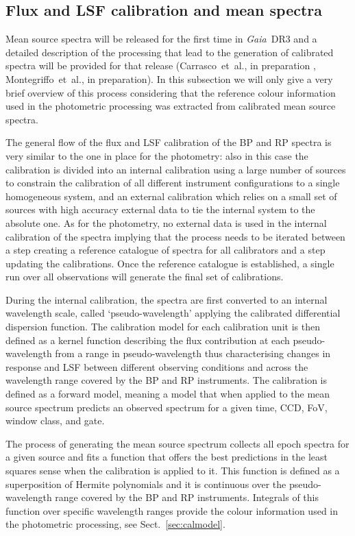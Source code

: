 \documentclass{aa}
\newcommand{\gaia}{\textit{Gaia}\xspace}
\newcommand{\drthree}{\gaia~DR3\xspace}
\newcommand{\xp}{BP and RP\xspace}
\newcommand{\citeipt}[1]{#1~et~al., in preparation\xspace}
\newcommand{\secname}{Sect.}
\newcommand{\secref}[1]{\secname~\ref{sec:#1}}
\begin{document}
\subsection{Flux and LSF calibration and mean spectra}\label{sec:meanspectra}

Mean source spectra will be released for the first time in \drthree and a detailed description of the processing that lead to the generation of calibrated spectra will be provided for that release (\citeipt{Carrasco} , \citeipt{Montegriffo}).
In this subsection we will only give a very brief overview of this process considering that the reference colour information used in the photometric processing was extracted from calibrated mean source spectra.

The general flow of the flux and LSF calibration of the \xp spectra is very similar to the one in place for the photometry: also in this case the calibration is divided into an internal calibration using a large number of sources to constrain the calibration of all different instrument configurations to a single homogeneous system, and an external calibration which relies on a small set of sources with high accuracy external data to tie the internal system to the absolute one. As for the photometry, no external data is used in the internal calibration of the spectra implying that the process needs to be iterated between a step creating a reference catalogue of spectra for all calibrators and a step updating the calibrations. 
Once the reference catalogue is established, a single run over all observations will generate the final set of calibrations.

During the internal calibration, the spectra are first converted to an internal wavelength scale, called `pseudo-wavelength' applying the calibrated differential dispersion function.
The calibration model for each calibration unit is then defined as a kernel function describing the flux contribution at each pseudo-wavelength from a range in pseudo-wavelength thus characterising changes in response and LSF between different observing conditions and across the wavelength range covered by the BP and RP instruments.
The calibration is defined as a forward model, meaning a model that when applied to the mean source spectrum predicts an observed spectrum for a given time, CCD, FoV, window class, and gate.

The process of generating the mean source spectrum collects all epoch spectra for a given source and fits a function that offers the best predictions in the least squares sense when the calibration is applied to it. This function is defined as a superposition of Hermite polynomials and it is continuous over the pseudo-wavelength range covered by the BP and RP instruments. Integrals of this function over specific wavelength ranges provide the colour information used in the photometric processing, see \secref{calmodel}.
\end{document}
